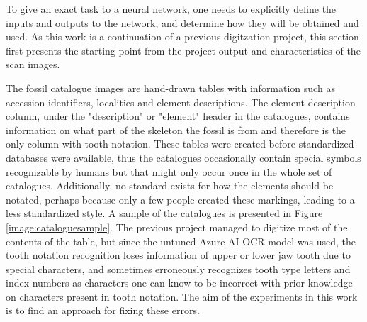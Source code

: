 \documentclass{article}
\begin{document}
To give an exact task to a neural network, one needs to explicitly define 
the inputs and outputs to the network, and determine how they will be obtained and used.
 As this work is a continuation of 
a previous digitzation project, this section first presents the starting point 
from the project output and characteristics of the scan images. 

The fossil catalogue images are hand-drawn tables with information such 
as accession identifiers, localities and element descriptions. The element description 
column, under the "description" or "element" header in the catalogues, contains 
information on what part of the skeleton the fossil is from and therefore is the only 
column with tooth notation. These tables were created before standardized databases
were available, thus the catalogues occasionally contain special symbols recognizable by humans
but that might only occur once in the whole set of catalogues. Additionally, 
no standard exists for how the elements should be notated, perhaps because only a few people 
created these markings, leading to a less standardized style.
A sample of the catalogues is presented in Figure \ref{image:cataloguesample}.
The previous project managed to digitize most of the contents of the table, but since 
the untuned Azure AI OCR model \cite{azurevision} was used, the tooth notation recognition
loses information of upper or lower jaw tooth due to special characters, and sometimes
erroneously recognizes tooth type letters and index numbers as characters one can know 
to be incorrect with prior knowledge on characters present in tooth notation.
The aim of the experiments in this work is to find an approach for fixing these errors.
\end{document}
